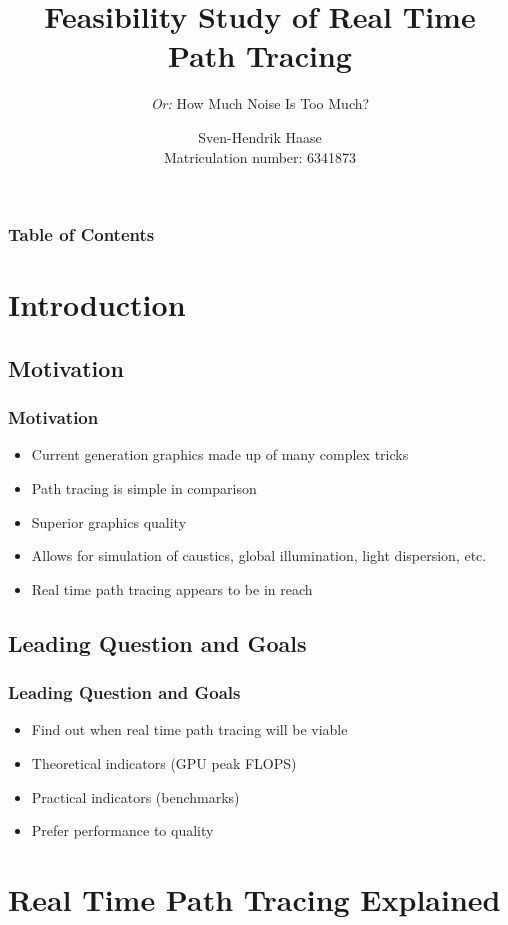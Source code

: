 \documentclass{beamer}
\title[Path Tracing]
{Feasibility Study of Real Time Path Tracing}
\subtitle{\textit{Or:} How Much Noise Is Too Much?}
\author[Haase]{Sven-Hendrik Haase \\ \footnotesize Matriculation number: 6341873}
\institute[University of Hamburg]{
    Department of Computer Science\\
    University of Hamburg
}
\begin{document}
\frame{\titlepage}
\begin{frame}
    \frametitle{Table of Contents}
    \footnotesize
    \tableofcontents
\end{frame}

\section{Introduction}

\subsection{Motivation}
\begin{frame}
    \frametitle{Motivation}
    \begin{itemize}
        \item Current generation graphics made up of many complex tricks
        \pause
        \item Path tracing is simple in comparison
        \pause
        \item Superior graphics quality
        \pause
        \item Allows for simulation of caustics, global illumination, light dispersion, etc.
        \pause
        \item Real time path tracing appears to be in reach
    \end{itemize}
\end{frame}

\subsection{Leading Question and Goals}
\begin{frame}
    \frametitle{Leading Question and Goals}
    \begin{itemize}
        \item Find out when real time path tracing will be viable
        \item Theoretical indicators (GPU peak FLOPS)
        \item Practical indicators (benchmarks)
        \item Prefer performance to quality
    \end{itemize}
\end{frame}

\section{Real Time Path Tracing Explained}
\end{document}
